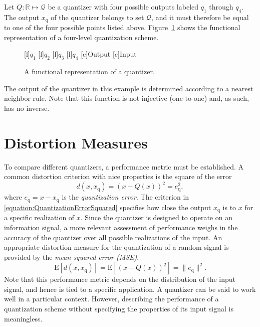 \begin{example}
Let $Q : \mathbb{R} \mapsto \mathcal{Q}$ be a quantizer with four possible outputs labeled $q_1$ through $q_4$.
The output $x_{\mathrm{q}}$ of the quantizer belongs to set $\mathcal{Q}$, and it must therefore be equal to one of the four possible points listed above.
Figure~\ref{figure:Quantizer} shows the functional representation of a four-level quantization scheme.
\begin{figure}[htbp]
\begin{center}
\begin{psfrags}
[l]{$q_1$}
[l]{$q_2$}
[l]{$q_3$}
[l]{$q_4$}
[c]{Output}
[c]{Input}
\end{psfrags}
\caption{A functional representation of a quantizer.}
\label{figure:Quantizer}
\end{center}
\end{figure}

The output of the quantizer in this example is determined according to a nearest neighbor rule.
Note that this function is not injective (one-to-one) and, as such, has no inverse.
\end{example}


\section{Distortion Measures}

To compare different quantizers, a performance metric must be established.
A common distortion criterion with nice properties is the square of the error
\begin{equation} \label{equation:QuantizationErrorSquared}
d(x, x_{\mathrm{q}}) = (x - Q(x))^2 = e_{\mathrm{q}}^2 ,
\end{equation}
where $e_{\mathrm{q}} = x - x_{\mathrm{q}}$ is the \emph{quantization error}.
The criterion in \eqref{equation:QuantizationErrorSquared} specifies how close the output $x_{\mathrm{q}}$ is to $x$ for a specific realization of $x$.
Since the quantizer is designed to operate on an information signal, a more relevant assessment of performance weighs in the accuracy of the quantizer over all possible realizations of the input.
An appropriate distortion measure for the quantization of a random signal is provided by the \emph{mean squared error (MSE)},
\begin{equation} \label{equation:QuantizationMSE}
\mathrm{E} [ d(x, x_{\mathrm{q}}) ]
= \mathrm{E} \left[ (x - Q(x))^2 \right] = \| e_{\mathrm{q}} \|^2 .
\end{equation}
Note that this performance metric depends on the distribution of the input signal, and hence is tied to a specific application.
A quantizer can be said to work well in a particular context.
However, describing the performance of a quantization scheme without specifying the properties of its input signal is meaningless.

